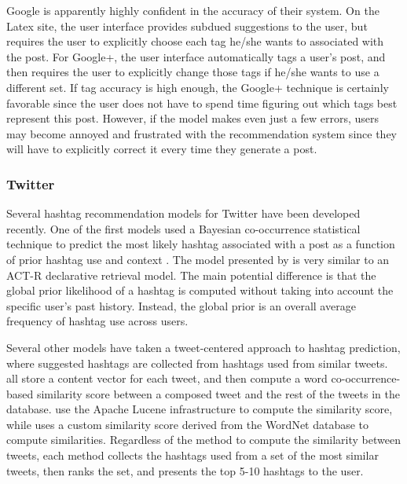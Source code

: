 \documentclass[man,floatsintext,donotrepeattitle]{apa6}
\begin{document}
Google is apparently highly confident in the accuracy of their system.
On the Latex site, the user interface provides subdued suggestions to the user, but requires the user to explicitly choose each tag he/she wants to associated with the post.
For Google+, the user interface automatically tags a user's post, and then requires the user to explicitly change those tags if he/she wants to use a different set.
If tag accuracy is high enough, the Google+ technique is certainly favorable since the user does not have to spend time figuring out which tags best represent this post.
However, if the model makes even just a few errors, users may become annoyed and frustrated with the recommendation system since they will have to explicitly correct it every time they generate a post.

\subsubsection{Twitter}

Several hashtag recommendation models for Twitter have been developed recently.
One of the first models used a Bayesian co-occurrence statistical technique to predict the most likely hashtag associated with a post as a function of prior hashtag use and context \parencite{Mazzia2009}.
The model presented by \textcite{Mazzia2009} is very similar to an ACT-R declarative retrieval model.
The main potential difference is that the global prior likelihood of a hashtag is computed without taking into account the specific user's past history.
Instead, the global prior is an overall average frequency of hashtag use across users.

Several other models have taken a tweet-centered approach to hashtag prediction, where suggested hashtags are collected from hashtags used from similar tweets.
\textcites{Li2011, Zangerle2011, Kywe2012} all store a content vector for each tweet, and then compute a word co-occurrence-based similarity score between a composed tweet and the rest of the tweets in the database.
\textcites{Zangerle2011, Kywe2012} use the Apache Lucene infrastructure to compute the similarity score, while \textcite{Li2011} uses a custom similarity score derived from the WordNet database to compute similarities.
Regardless of the method to compute the similarity between tweets, each method collects the hashtags used from a set of the most similar tweets, then ranks the set, and presents the top 5-10 hashtags to the user.
\end{document}
